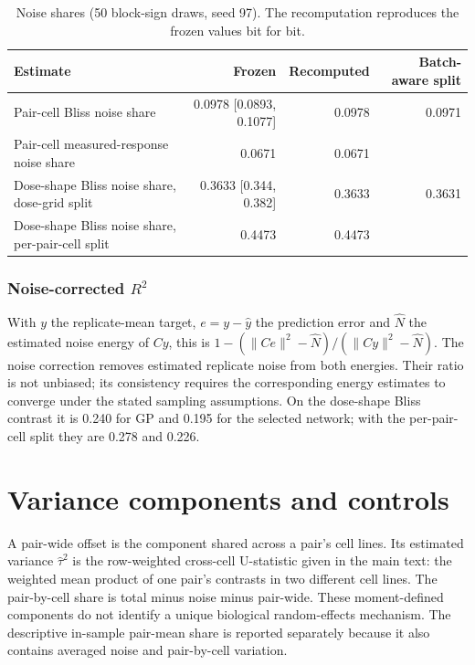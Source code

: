 \documentclass[11pt]{article}
\begin{document}
\begin{table}[htbp]
\caption{Noise shares (50 block-sign draws, seed 97). The recomputation reproduces the frozen values bit for bit.}\label{tab:S2}
\centering\small
\begin{tabularx}{\linewidth}{@{}L r r r@{}}
\toprule
Estimate & Frozen & Recomputed & Batch-aware split \\
\midrule
Pair-cell Bliss noise share & 0.0978 [0.0893, 0.1077] & 0.0978 & 0.0971 \\
Pair-cell measured-response noise share & 0.0671 & 0.0671 &  \\
Dose-shape Bliss noise share, dose-grid split & 0.3633 [0.344, 0.382] & 0.3633 & 0.3631 \\
Dose-shape Bliss noise share, per-pair-cell split & 0.4473 & 0.4473 &  \\
\bottomrule
\end{tabularx}
\end{table}
\subsubsection*{Noise-corrected $R^2$} With $y$ the replicate-mean target, $e=y-\hat y$ the prediction error and $\hat N$ the estimated noise energy of $Cy$, this is $1-(\|Ce\|^2-\hat N)/(\|Cy\|^2-\hat N)$. The noise correction removes estimated replicate noise from both energies. Their ratio is not unbiased; its consistency requires the corresponding energy estimates to converge under the stated sampling assumptions. On the dose-shape Bliss contrast it is 0.240 for GP and 0.195 for the selected network; with the per-pair-cell split they are 0.278 and 0.226.

\section{Variance components and controls}\label{sec:S4}
A pair-wide offset is the component shared across a pair's cell lines. Its estimated variance $\hat\tau^2$ is the row-weighted cross-cell U-statistic given in the main text: the weighted mean product of one pair's contrasts in two different cell lines. The pair-by-cell share is total minus noise minus pair-wide. These moment-defined components do not identify a unique biological random-effects mechanism. The descriptive in-sample pair-mean share is reported separately because it also contains averaged noise and pair-by-cell variation.
\end{document}
